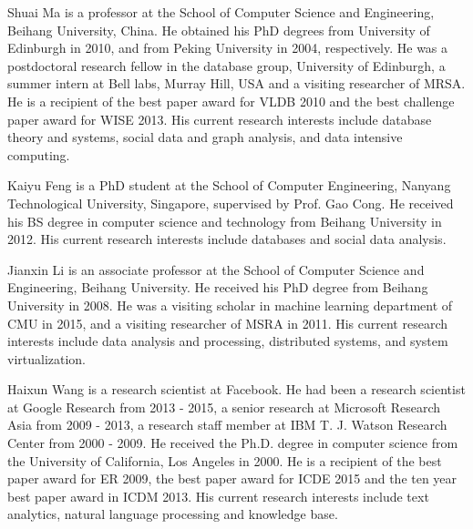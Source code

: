 \documentclass[10pt,journal,compsoc,twoside]{IEEEtran}
\begin{document}
\vspace{-6ex}
\begin{IEEEbiography}{Shuai Ma} is a professor at the School of Computer Science and Engineering, Beihang University, China.
He obtained his PhD degrees from University of Edinburgh in 2010, and from
Peking University in 2004, respectively. He was a postdoctoral research fellow in the database group,
University of Edinburgh, a summer intern at Bell labs, Murray Hill, USA and a visiting researcher of MRSA.
He is a recipient of the best paper award for VLDB 2010 and the best challenge paper award for WISE 2013. His current research interests include database theory and systems, social data and graph analysis, and data intensive computing.
\end{IEEEbiography}
\vspace{-6ex}
\begin{IEEEbiography}{Kaiyu Feng} is a PhD student at the School of Computer Engineering, Nanyang Technological University, Singapore, supervised by Prof. Gao Cong. He received his BS degree in computer science and technology from Beihang University in 2012. His current research interests include databases and social data analysis.
\end{IEEEbiography}
\vspace{-6ex}
\begin{IEEEbiography}{Jianxin Li} is an associate professor at the School of Computer Science and Engineering, Beihang University.  He received his PhD degree from Beihang University in 2008. He was a visiting scholar in machine learning department of CMU in 2015, and a visiting researcher of MSRA in 2011.  His current research interests include data analysis and processing, distributed systems, and system virtualization.
\end{IEEEbiography}
\vspace{-6ex}
\begin{IEEEbiography}{Haixun Wang} is a research scientist at
Facebook. He had been a research scientist at Google Research from 2013 - 2015, a senior research at Microsoft
Research Asia from 2009 - 2013, a research staff member at IBM T. J. Watson
Research Center from 2000 - 2009. He received the Ph.D. degree
in computer science from the University of California, Los Angeles in
2000.  He  is a recipient of the best paper award for
ER 2009, the best paper award for ICDE 2015 and the ten year best paper award in ICDM 2013. His current research interests include text analytics, natural language processing and knowledge base.
\end{IEEEbiography}
\end{document}

